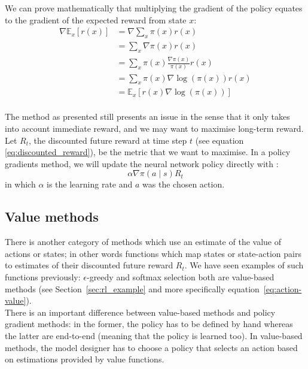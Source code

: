 We can prove mathematically that multiplying the gradient of the policy
equates to the gradient of the expected reward from state $x$:
\begin{align*}
	\nabla \mathbb{E}_x[r(x)] &= \nabla \sum\limits_x\pi(x)r(x)\\
	&=  \sum\limits_x \nabla\pi(x)r(x)\\
	&=  \sum\limits_x \pi(x)\frac{\nabla\pi(x)}{\pi(x)}r(x)\\
	&=  \sum\limits_x \pi(x)\nabla\log(\pi(x))r(x)\\
	&=  \mathbb{E}_x[r(x)\nabla\log(\pi(x))]\\
\end{align*}

The method as presented still presents an issue in the sense that it only takes
into account immediate reward, and we may want to maximise long-term reward.
Let $R_t$, the discounted future reward at time step $t$ (see equation 
\ref{eq:discounted_reward}), be the metric
that we want to maximise. In a policy gradients method, we will update the
neural network policy directly with :
\begin{equation}
	\label{eq:policy_update_rule}
	\alpha \nabla \pi(a \mid s) R_t
\end{equation}
in which $\alpha$ is the learning rate and $a$ was the chosen action.

\subsection{Value methods}
There is another category of methods which use an estimate of the value of
actions or states; in other words functions which map states or state-action
pairs to estimates of their discounted future reward $R_t$. We have seen
examples of such functions previously: $\epsilon$-greedy and softmax
selection both are value-based methods (see Section~\ref{sec:rl_example} and
more specifically equation~\ref{eq:action-value}).\\

There is an important
difference between value-based methods and policy gradient methods: in the
former, the policy has to be defined by hand whereas the latter are
end-to-end (meaning that the policy is learned too). In value-based methods,
the model designer has to choose a policy that selects an action based
on estimations provided by value functions.\\

